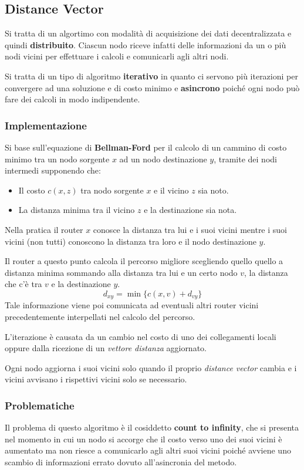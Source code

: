 \subsection{Distance Vector}
Si tratta di un algortimo con modalità di acquisizione dei dati
decentralizzata e quindi \textbf{distribuito}. Ciascun nodo riceve
infatti delle informazioni da un o più nodi vicini per effettuare
i calcoli e comunicarli agli altri nodi.

Si tratta di un tipo di algoritmo \textbf{iterativo} in quanto ci
servono più iterazioni per convergere ad una soluzione e di costo
minimo e \textbf{asincrono} poiché ogni nodo può fare dei calcoli in
modo indipendente.

\subsubsection{Implementazione}
Si base sull'equazione di \textbf{Bellman-Ford} per il calcolo di un
cammino di costo minimo tra un nodo sorgente $x$ ad un nodo 
destinazione $y$, tramite dei nodi intermedi supponendo che:
\begin{itemize}
	\item Il costo $c(x,z)$ tra nodo sorgente $x$ e il vicino $z$ sia
		noto.
	\item La distanza minima tra il vicino $z$ e la destinazione sia
		nota.
\end{itemize}
Nella pratica il router $x$ conosce la distanza tra lui e i suoi vicini
mentre i suoi vicini (non tutti) conoscono la distanza tra loro e il
nodo destinazione $y$.

Il router a questo punto calcola il percorso migliore scegliendo quello
quello a distanza minima sommando alla distanza tra lui e un certo
nodo $v$, la distanza che c'è tra $v$ e la destinazione $y$.
\[ d_{xy} = \min \{ c(x, v) + d_{vy} \} \]
Tale informazione viene poi comunicata ad eventuali altri router vicini
precedentemente interpellati nel calcolo del percorso.

L'iterazione è causata da un cambio nel costo di uno dei collegamenti
locali oppure dalla ricezione di un \emph{vettore distanza} aggiornato.

Ogni nodo aggiorna i suoi vicini solo quando il proprio \emph{distance
vector} cambia e i vicini avvisano i rispettivi vicini solo se 
necessario.

\subsubsection{Problematiche}
Il problema di questo algoritmo è il cosiddetto \textbf{count to
infinity}, che si presenta nel momento in cui un nodo si accorge che
il costo verso uno dei suoi vicini è aumentato ma non riesce a
comunicarlo agli altri suoi vicini poiché avviene uno scambio di
informazioni errato dovuto all'asincronia del metodo.

